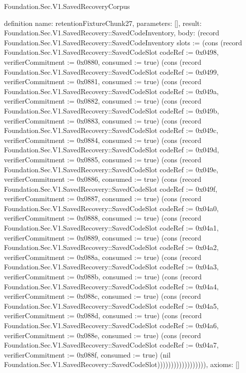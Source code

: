 \begin{lexlean}{Foundation.Sec.V1.SavedRecoveryCorpus}
\begin{semanticmodule}
definition{
  name: retentionFixtureChunk27,
  parameters: [],
  result: Foundation.Sec.V1.SavedRecovery::SavedCodeInventory,
  body: (record Foundation.Sec.V1.SavedRecovery::SavedCodeInventory {slots := (cons (record Foundation.Sec.V1.SavedRecovery::SavedCodeSlot {codeRef := 0x0498, verifierCommitment := 0x0880, consumed := true}) (cons (record Foundation.Sec.V1.SavedRecovery::SavedCodeSlot {codeRef := 0x0499, verifierCommitment := 0x0881, consumed := true}) (cons (record Foundation.Sec.V1.SavedRecovery::SavedCodeSlot {codeRef := 0x049a, verifierCommitment := 0x0882, consumed := true}) (cons (record Foundation.Sec.V1.SavedRecovery::SavedCodeSlot {codeRef := 0x049b, verifierCommitment := 0x0883, consumed := true}) (cons (record Foundation.Sec.V1.SavedRecovery::SavedCodeSlot {codeRef := 0x049c, verifierCommitment := 0x0884, consumed := true}) (cons (record Foundation.Sec.V1.SavedRecovery::SavedCodeSlot {codeRef := 0x049d, verifierCommitment := 0x0885, consumed := true}) (cons (record Foundation.Sec.V1.SavedRecovery::SavedCodeSlot {codeRef := 0x049e, verifierCommitment := 0x0886, consumed := true}) (cons (record Foundation.Sec.V1.SavedRecovery::SavedCodeSlot {codeRef := 0x049f, verifierCommitment := 0x0887, consumed := true}) (cons (record Foundation.Sec.V1.SavedRecovery::SavedCodeSlot {codeRef := 0x04a0, verifierCommitment := 0x0888, consumed := true}) (cons (record Foundation.Sec.V1.SavedRecovery::SavedCodeSlot {codeRef := 0x04a1, verifierCommitment := 0x0889, consumed := true}) (cons (record Foundation.Sec.V1.SavedRecovery::SavedCodeSlot {codeRef := 0x04a2, verifierCommitment := 0x088a, consumed := true}) (cons (record Foundation.Sec.V1.SavedRecovery::SavedCodeSlot {codeRef := 0x04a3, verifierCommitment := 0x088b, consumed := true}) (cons (record Foundation.Sec.V1.SavedRecovery::SavedCodeSlot {codeRef := 0x04a4, verifierCommitment := 0x088c, consumed := true}) (cons (record Foundation.Sec.V1.SavedRecovery::SavedCodeSlot {codeRef := 0x04a5, verifierCommitment := 0x088d, consumed := true}) (cons (record Foundation.Sec.V1.SavedRecovery::SavedCodeSlot {codeRef := 0x04a6, verifierCommitment := 0x088e, consumed := true}) (cons (record Foundation.Sec.V1.SavedRecovery::SavedCodeSlot {codeRef := 0x04a7, verifierCommitment := 0x088f, consumed := true}) (nil Foundation.Sec.V1.SavedRecovery::SavedCodeSlot)))))))))))))))))}),
  axioms: []
}


\end{semanticmodule}
\end{lexlean}
